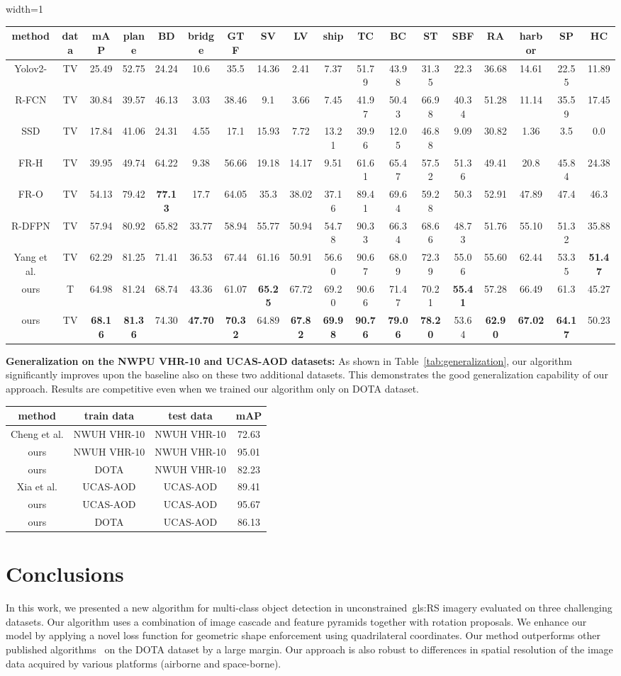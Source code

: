 \documentclass[runningheads]{llncs}
\newcommand{\OBBbenchmarktable}{
	\begin{table*}[t]
		\centering
		\caption{Quantitative comparison of the baselines and our method on the OBB prediction task in test set of DOTA dataset. Abbreviations are the same as in Table \ref{tab:benchmarkhbb}.  Note that only FR-O\cite{fasterrcnnNIPS2015} is trained with OBB.}
		\begin{adjustbox}{width=1\textwidth}
			\label{tab:benchmarkobb}
			\begin{tabular}{c|c|c||ccccccccccccccc}
				method& data   &mAP    &plane       &BD   &bridge&GTF  &SV   &LV   &ship &TC   &BC   &ST   &SBF  &RA   &harbor&SP   &HC \\
				\toprule\toprule
				Yolov2-\cite{redmon2017yolo9000} & TV &
				25.49 &	52.75 &	24.24 &	10.6 &	35.5 &	14.36 &	2.41 &	7.37 &	51.79 &	43.98 &	31.35 &	22.3 &	36.68 &	14.61 &	22.55 &	11.89\\
				R-FCN\cite{NIPS2016_6465} & TV       &
				30.84 &	39.57 &	46.13 &	3.03 &	38.46 &	9.1 &	3.66 &	7.45 &	41.97 &	50.43& 	66.98 &	40.34 &	51.28 &	11.14 &	35.59 &	17.45\\
				SSD\cite{DBLP:conf/eccv/LiuAESRFB16} & TV &
				17.84  &	41.06  &	24.31  &	4.55  &	17.1  &	15.93  &	7.72  &	13.21  & 39.96  & 12.05  &	46.88  & 9.09  &	30.82  & 1.36  &	3.5  &	0.0\\
				FR-H\cite{fasterrcnnNIPS2015} & TV  &39.95 &	49.74 &	64.22 &	9.38 &	56.66 &	19.18 &	14.17 &	9.51 &	61.61 &	65.47 &	57.52 &	51.36 &	49.41 &	20.8 &	45.84 &	24.38\\
				FR-O\cite{fasterrcnnNIPS2015} &TV&54.13  &		79.42  &	\textbf{	77.13  }&		17.7  &		64.05  &		35.3  &		38.02  &		37.16  &		89.41  &		69.64  &	59.28  &		50.3  &		52.91  &		47.89  &		47.4  &	46.3\\
				R-DFPN\cite{D-FPN} & TV &57.94  &		80.92  &	65.82&		33.77  &		58.94  &		55.77  &		50.94  &		54.78  &		90.33  &		66.34  &	68.66  &		48.73  &		51.76  &		55.10  &		51.32  &	35.88\\
				Yang et al.\cite{XueYang2018} & TV &62.29  &		81.25 &	71.41&		36.53  &		67.44  &		61.16  &	50.91	  &		56.60  &		90.67  &		68.09  &	72.39  &	55.06  &	55.60   &		62.44  &	53.35  &\textbf{51.47}\\
				ours & T &64.98
				& 81.24& 68.74
				& 43.36& 61.07
				& \textbf{65.25}&67.72
				& 69.20& 90.66
				& 71.47& 70.21
				& \textbf{55.41}& 57.28
				& 66.49& 61.3&45.27\\
				ours & TV &\textbf{68.16}
				& \textbf{81.36}& 74.30
				& \textbf{47.70}& \textbf{70.32}
				& 64.89& \textbf{67.82}
				& \textbf{69.98}& \textbf{90.76}
				& \textbf{79.06}& \textbf{78.20}
				& 53.64& \textbf{62.90}
				& \textbf{67.02}& \textbf{64.17}&50.23\\
			\end{tabular}
		\end{adjustbox}
	\end{table*}
}
\newcommand{\ucasnwptable}{
  \begin{table*}[b!]
    \centering
    \caption{Comparison of results on NWUH VHR-10 and UCAS-AOD
      datasets.}
    \label{tab:generalization}
    \begin{tabular}{c|c|c||c}
      method& train data & test data &mAP\\
      \midrule\midrule
      Cheng et al.\cite{Chengnwhu} & NWUH VHR-10 & NWUH VHR-10 & 72.63\\
      ours & NWUH VHR-10 & NWUH VHR-10 & 95.01\\ \cdashline{1-1}
      ours & DOTA & NWUH VHR-10 & 82.23\\
      \midrule
      Xia et al.\cite{dota}  & UCAS-AOD & UCAS-AOD & 89.41\\
      ours & UCAS-AOD & UCAS-AOD & 95.67\\ \cdashline{1-1}
      ours & DOTA & UCAS-AOD & 86.13\\
    \end{tabular}
  \end{table*}
}
\begin{document}
\OBBbenchmarktable
    \textbf{Generalization on the NWPU VHR-10 and UCAS-AOD datasets:} As shown in Table~\ref{tab:generalization}, our algorithm significantly improves upon the baseline also on these two additional datasets.
This demonstrates the good generalization capability of our approach.
Results are competitive even when we trained our algorithm only on DOTA dataset.
\ucasnwptable
	\section{Conclusions}\label{sec:conclusion}
	In this work, we presented a new algorithm for multi-class object detection in unconstrained~\gls{gls:RS} imagery evaluated on three challenging datasets.
	Our algorithm uses a combination of image cascade and feature pyramids together with rotation proposals.
	We enhance our model by applying a novel loss function for geometric shape enforcement using quadrilateral coordinates.
    Our method outperforms other published algorithms~\cite{dota,XueYang2018} on the DOTA dataset by a large margin.
    Our approach is also robust to differences in spatial resolution of the image data acquired by various platforms (airborne and space-borne).


\end{document}
